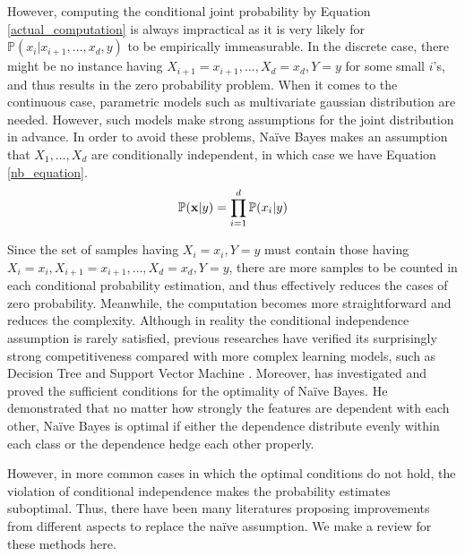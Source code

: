 \documentclass[twoside,11pt]{article}
\begin{document}
However, computing the conditional joint probability by Equation \ref{actual_computation} is always impractical as it is very likely for $\mathbb{P}(x_i|x_{i+1},\dots,x_d,y)$ to be empirically immeasurable. In the discrete case, there might be no instance having $X_{i+1}=x_{i+1},\dots,X_d=x_d,Y=y$ for some small $i$'s, and thus results in the zero probability problem. When it comes to the continuous case, parametric models such as multivariate gaussian distribution are needed. However, such models make strong assumptions for the joint distribution in advance. In order to avoid these problems, Na\"ive Bayes makes an assumption that $X_1,\dots,X_d$ are conditionally independent, in which case we have Equation \ref{nb_equation}.
\begin{equation}
    \centering
    \mathbb{P}(\mathbf{x}|y)=\prod_{i=1}^{d}\mathbb{P}(x_i|y)
    \label{nb_equation}
\end{equation}

Since the set of samples having $X_i=x_i, Y=y$ must contain those having $X_i=x_i,X_{i+1}=x_{i+1},\dots,X_d=x_d,Y=y$, there are more samples to be counted in each conditional probability estimation, and thus effectively reduces the cases of zero probability. Meanwhile, the computation becomes more straightforward and reduces the complexity. Although in reality the conditional independence assumption is rarely satisfied, previous researches have verified its surprisingly strong competitiveness compared with more complex learning models, such as Decision Tree and Support Vector Machine \citep{dougherty1995supervised, huang2003comparing}. Moreover, \citet{zhang2004optimality} has investigated and proved the sufficient conditions for the optimality of Na\"ive Bayes. He demonstrated that no matter how strongly the features are dependent with each other, Na\"ive Bayes is optimal if either the dependence distribute evenly within each class or the dependence hedge each other properly.

However, in more common cases in which the optimal conditions do not hold, the violation of conditional independence makes the probability estimates suboptimal. Thus, there have been many literatures proposing improvements from different aspects to replace the na\"ive assumption. We make a review for these methods here.
\end{document}
